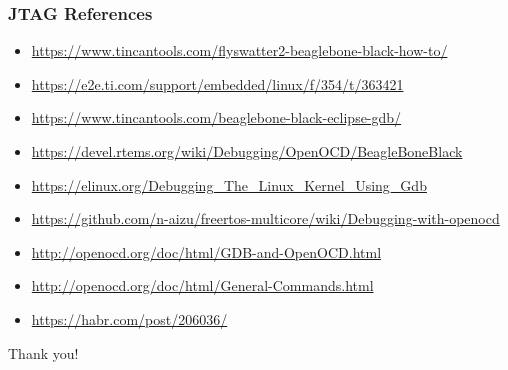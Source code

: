 \begin{frame}
  \frametitle{JTAG References}
  \begin{itemize}
    \item \url{https://www.tincantools.com/flyswatter2-beaglebone-black-how-to/}
    \item \url{https://e2e.ti.com/support/embedded/linux/f/354/t/363421}
    \item \url{https://www.tincantools.com/beaglebone-black-eclipse-gdb/}
    \item \url{https://devel.rtems.org/wiki/Debugging/OpenOCD/BeagleBoneBlack}
    \item \url{https://elinux.org/Debugging\_The\_Linux\_Kernel\_Using\_Gdb}
    \item \url{https://github.com/n-aizu/freertos-multicore/wiki/Debugging-with-openocd}
    \item \url{http://openocd.org/doc/html/GDB-and-OpenOCD.html}
    \item \url{http://openocd.org/doc/html/General-Commands.html}
    \item \url{https://habr.com/post/206036/}
  \end{itemize}
  \vspace*{-10mm}
\end{frame}

\begin{frame}[standout]
  Thank you!
\end{frame}


